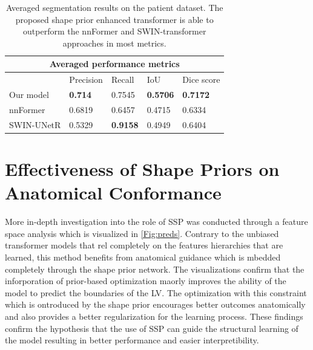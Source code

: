 \begin{table}[h!t]
    \begin{tabular}{ |p{2.3cm}|p{2.3cm}|p{2.3cm}|p{2.3cm}|p{2.3cm}|}
            \hline
            \multicolumn{5}{|c|}{Averaged performance metrics} \\
            \hline
             & Precision & Recall & IoU & Dice score \\
            \hline
            Our model & \textbf{0.714} & 0.7545 & \textbf{0.5706} & \textbf{0.7172} \\
            \hline
            nnFormer & 0.6819 & 0.6457 & 0.4715 & 0.6334 \\
            \hline
            SWIN-UNetR & 0.5329 & \textbf{0.9158} & 0.4949 & 0.6404 \\
            \hline
    \end{tabular}
    \caption{Averaged segmentation results on the patient dataset. The proposed shape prior enhanced transformer is able to outperform the nnFormer \cite{zhou2023nnformer} and SWIN-transformer \cite{10.1007/978-3-031-08999-2_22} approaches in most metrics.}
    \label{tab:quantitative_comparison}
  \end{table}


\section{Effectiveness of Shape Priors on Anatomical Conformance}
More in-depth investigation into the role of SSP was conducted through a feature space analysis which is visualized in \cref{Fig:preds}. Contrary to the unbiased transformer models that rel completely on the features hierarchies that are learned, this method benefits from anatomical guidance which is mbedded completely through the shape prior network. The visualizations confirm that the inforporation of prior-based optimization maorly improves the ability of the model to predict the boundaries of the LV. The optimization with this constraint which is ontroduced by the shape prior encourages better outcomes anatomically and also provides a better regularization for the learning process. These findings confirm the hypothesis that the use of SSP can guide the structural learning of the model resulting in better performance and easier interpretibility.

